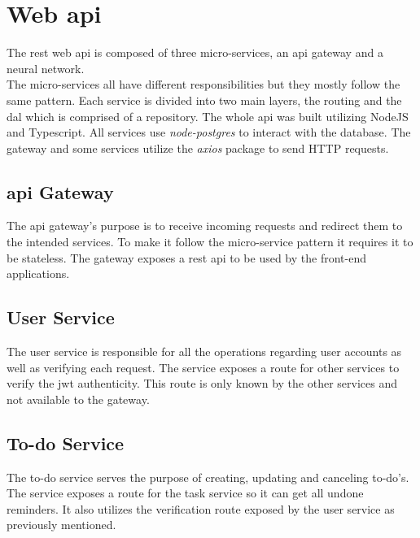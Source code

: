 \chapter{Web \gls{api}}
	
	
	The \gls{rest} web \gls{api} is composed of three micro-services, an \gls{api} gateway and a neural network\cite{neuralnetwork}.\\
	The micro-services all have different responsibilities but they mostly follow the same pattern. Each service is divided into two main layers, the routing and the \gls{dal} which is comprised of a repository.
	The whole \gls{api} was built utilizing NodeJS\cite{node} and Typescript\cite{typescript}.
	All services use \textit{node-postgres}\cite{node-postgres} to interact with the database.
	The gateway and some services utilize the \textit{axios}\cite{axios} package to send HTTP requests.
	
	
	\section{\gls{api} Gateway}
	
		The \gls{api} gateway's purpose is to receive incoming requests and redirect them to the intended services. To make it follow the micro-service pattern it requires it to be stateless.
		The gateway exposes a \gls{rest} \gls{api} to be used by the front-end applications. 
		
		
	\section{User Service}
		
		The user service is responsible for all the operations regarding user accounts as well as verifying each request. The service exposes a route for other services to verify the \gls{jwt} authenticity. This route is only known by the other services and not available to the gateway.
	
	\section{To-do Service}
		The to-do service serves the purpose of creating, updating and canceling to-do's. The service exposes a route for the task service so it can get all undone reminders. It also utilizes the verification route exposed by the user service as previously mentioned.
	
